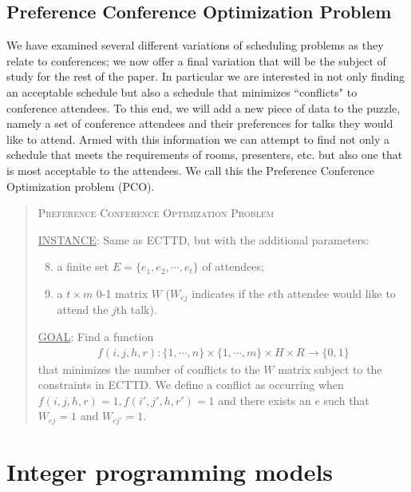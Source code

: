 \documentclass{svjour3}                     %
\begin{document}
\subsection{Preference Conference Optimization Problem}
We have examined several different variations of scheduling problems as they relate to conferences; we now offer a final variation that will be the subject of study for the rest of the paper. In particular we are interested in not only finding an acceptable schedule but also a schedule that minimizes ``conflicts" to conference attendees. To this end, we will add a new piece of data to the puzzle, namely a set of conference attendees and their preferences for talks they would like to attend. Armed with this information we can attempt to find not only a schedule that meets the requirements of rooms, presenters, etc. but also one that is most acceptable to the attendees. We call this the Preference Conference Optimization problem (PCO).
\begin{quote}
	\textsc{Preference Conference Optimization Problem}
	
	\underline{INSTANCE}: Same as ECTTD, but with the additional parameters:
	\begin{enumerate}[1.]
		\setcounter{enumi}{7}
		\item a finite set $E = \{e_1, e_2, \cdots, e_t\}$ of attendees;
		\item a $t \times m$ 0-1 matrix $W$ ($W_{ej}$ indicates if the $e$th attendee would like to attend the $j$th talk).
	\end{enumerate}
	
	\underline{GOAL}: Find a function 
	\begin{gather*}
		f(i,j,h,r) : \{1,\cdots,n\} \times \{1,\cdots,m\} \times H \times R \rightarrow \{0,1\}
	\end{gather*}
	that minimizes the number of conflicts to the $W$ matrix subject to the constraints in ECTTD. We define a conflict as occurring when $f(i,j,h,r)=1, f(i',j',h,r')=1$ and there exists an $e$ such that $W_{ej}=1$ and $W_{ej'}=1$.
\end{quote}

\section{Integer programming models}
\end{document}
